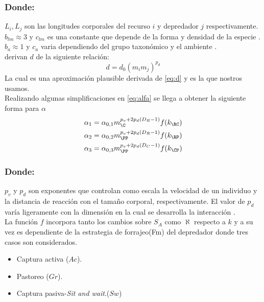 \subsubsection*{Donde:}
$L_i , L_j$ son las longitudes corporales del recurso $i$ y depredador $j$ respectivamente. \\
$b_{lm} \approx 3 $ y $c_{lm}$ es una constante que depende de la forma y densidad de la especie \citep{peters1986ecological,mcgill2006allometric}. \\
$b_a \approx 1 $ y $c_a$ varia dependiendo del grupo taxon\'omico y el ambiente \citep{kiltie2000scaling} .\\
\cite{pawar2012dimensionality} derivan $d$ de la siguiente relaci\'on:
\[ d = d_0(m_im_j)^{p_d} \]
La cual es una aproximaci\'on plausible derivada de \eqref{eq:d} y es la que nostros usamos.\\
Realizando algunas simplificaciones en \eqref{eq:alfa} se llega a obtener la siguiente forma para $\alpha$ 
\begin{equation}\label{eq:p4}
\begin{aligned}
&\alpha_1= \alpha_{0,1}m_\C^{p_v+2p_d(D_R-1)}f(k_{\RC})\\
&\alpha_2= \alpha_{0,2}m_\PP^{p_v+2p_d(D_R-1)}f(k_{\RP})\\
&\alpha_3= \alpha_{0,3} m_\PP^{p_v+2p_d(D_C-1)}f(k_{\CP})\\
\end{aligned}
\end{equation}
\subsubsection*{Donde:}
$p_v$ y $p_d$ son exponentes que controlan como escala la velocidad de un individuo  y la distancia de reacci\'on con el tama\~no corporal, respectivamente. El valor de $p_d$ var\'ia ligeramente con la dimensi\'on en la cual se desarrolla la interacci\'on \citep{pawar2012dimensionality}.\\
La funci\'on $f$ incorpora tanto los cambios sobre $S_A$ como $\aleph$ respecto a $k$ y a su vez es dependiente de la estrategia de forrajeo(Fm) del depredador donde tres casos son considerados\citep{pawar2012dimensionality}.
\begin{itemize}
\item Captura activa ($Ac$).
\item Pastoreo ($Gr$).
\item Captura pasiva-\textit{Sit and wait}.($Sw$) 
\end{itemize}

